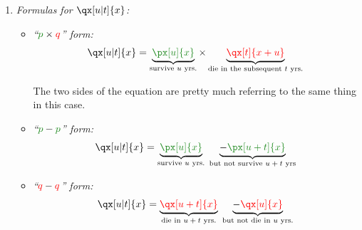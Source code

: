 \begin{enumerate}
\begin{enumerate}
\begin{warning}
There is \underline{not} a ``factorization formula for \(q\)''!
\end{warning}

\item\label{it:utqx-fmlas} \emph{Formulas for \(\qx[u|t]{x}\):}
\begin{itemize}
\item \emph{``\(\gc{p}\times \rc{q}\)'' form:} 
\[\qx[u|t]{x}=\underbrace{\gc{\px[u]{x}}}_{\text{survive \(u\) yrs.}}\times 
\underbrace{\rc{\qx[t]{x+u}}}_{\text{die in the subsequent \(t\) yrs.}}\]
\begin{center}
\end{center}
The two sides of the equation are pretty much referring to the same thing in this case.

\item \emph{``\(\gc{p}-\gc{p}\)'' form:}
\[
\qx[u|t]{x}=\underbrace{\gc{\px[u]{x}}}_{\text{survive \(u\) yrs.}}\;
\underbrace{-\gc{\px[u+t]{x}}}_{\text{but not survive \(u+t\) yrs}}
\]
\item \emph{``\({\color{red}q}-{\color{red}q}\)'' form:}
\[
\qx[u|t]{x}=\underbrace{\rc{\qx[u+t]{x}}}_{\text{die in \(u+t\) yrs.}}\;
\underbrace{-\rc{\qx[u]{x}}}_{\text{but not die in \(u\) yrs.}}
\]
\end{itemize}
\end{enumerate}
\end{enumerate}
